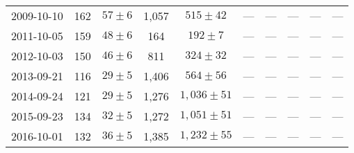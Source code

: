 \documentclass[12pt,letterpaper]{article}
\begin{document}
\begin{landscape}
\begin{longtable}{cccccccccc}
	{2009-10-10} & 162 & {$57  \pm  6$} & 1,057 & {$515 \pm 42$} & --- & --- & --- & --- & --- \\
	{2011-10-05} & 159 & {$48  \pm  6$} & 164 & {$192 \pm 7$} & --- & --- & --- & --- & --- \\
	{2012-10-03} & 150 & {$46  \pm  6$} & 811 & {$324 \pm 32$} & --- & --- & --- & --- & --- \\
	{2013-09-21} & 116 & {$29  \pm  5$} & 1,406 & {$564 \pm 56$} & --- & --- & --- & --- & --- \\
	{2014-09-24} & 121 & {$29  \pm  5$} & 1,276 & {$1,036 \pm 51$} & --- & --- & --- & --- & --- \\
	{2015-09-23} & 134 & {$32  \pm  5$} & 1,272 & {$1,051 \pm 51$} & --- & --- & --- & --- & --- \\
	{2016-10-01} & 132 & {$36  \pm  5$} & 1,385 & {$1,232 \pm 55$} & --- & --- & --- & --- & --- \\
\end{longtable}
	\end{landscape}
	
\end{document}
